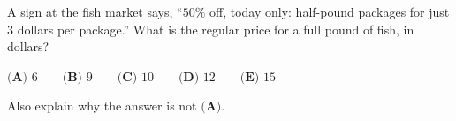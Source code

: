 A sign at the fish market says, ``$50\%$ off, today only: half-pound packages for just $3$ dollars per package.'' What is the regular price for a full pound of fish, in dollars?

$\textbf{(A) }6\qquad\textbf{(B) }9\qquad\textbf{(C) }10\qquad\textbf{(D) }12\qquad\textbf{(E) }15$

Also explain why the answer is not $\textbf{(A)}$.
